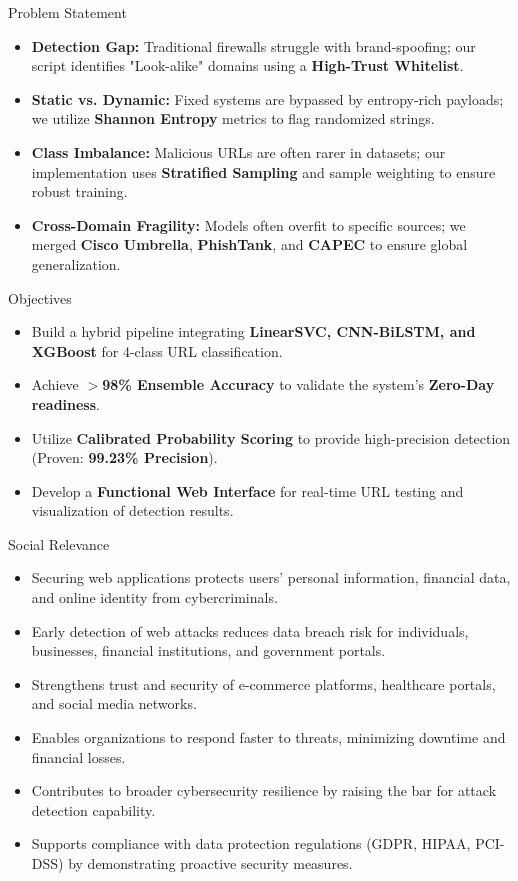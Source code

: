 \documentclass[aspectratio=169,xcolor=dvipsnames]{beamer}
\begin{document}
\begin{frame}{Problem Statement}
\begin{itemize}
    \item \textbf{Detection Gap:} Traditional firewalls struggle with brand-spoofing; our script identifies "Look-alike" domains using a \textbf{High-Trust Whitelist}.
    \item \textbf{Static vs. Dynamic:} Fixed systems are bypassed by entropy-rich payloads; we utilize \textbf{Shannon Entropy} metrics to flag randomized strings.
    \item \textbf{Class Imbalance:} Malicious URLs are often rarer in datasets; our implementation uses \textbf{Stratified Sampling} and sample weighting to ensure robust training.
    \item \textbf{Cross-Domain Fragility:} Models often overfit to specific sources; we merged \textbf{Cisco Umbrella}, \textbf{PhishTank}, and \textbf{CAPEC} to ensure global generalization.
\end{itemize}
\end{frame}

\begin{frame}{Objectives}
\begin{itemize}
    \item Build a hybrid pipeline integrating \textbf{LinearSVC, CNN-BiLSTM, and XGBoost} for 4-class URL classification.
    \item Achieve \textbf{$>$98\% Ensemble Accuracy} to validate the system's \textbf{Zero-Day readiness}.
    \item Utilize \textbf{Calibrated Probability Scoring} to provide high-precision detection (Proven: \textbf{99.23\% Precision}).
    \item Develop a \textbf{Functional Web Interface} for real-time URL testing and visualization of detection results.
    
\end{itemize}
\end{frame}
\begin{frame}{Social Relevance}
\begin{itemize}
    \item Securing web applications protects users' personal information, financial data, and online identity from cybercriminals.
    \item Early detection of web attacks reduces data breach risk for individuals, businesses, financial institutions, and government portals.
    \item Strengthens trust and security of e-commerce platforms, healthcare portals, and social media networks.
    \item Enables organizations to respond faster to threats, minimizing downtime and financial losses.
    \item Contributes to broader cybersecurity resilience by raising the bar for attack detection capability.
    \item Supports compliance with data protection regulations (GDPR, HIPAA, PCI-DSS) by demonstrating proactive security measures.
\end{itemize}
\end{frame}
\end{document}
